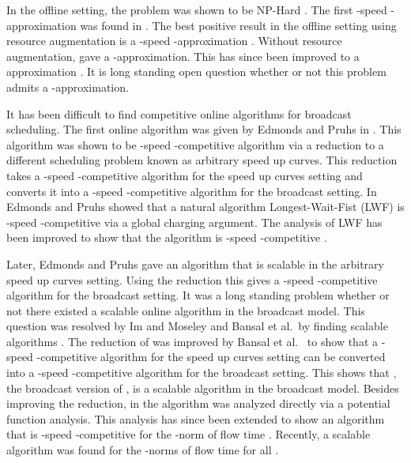 \documentclass[11pt]{article}
\newcommand{\etal}{et al.\ }
\begin{document}
In the offline setting,  the problem was shown to be NP-Hard \cite{ErlebachH02,ChangEGK08}.  The first -speed -approximation was found in \cite{KalyanasundaramPV00}. The best positive result in the offline setting using resource augmentation is a -speed -approximation \cite{BansalCKN05}.    Without resource augmentation, \cite{BansalCKN05} gave a -approximation.  This has since been improved to a  approximation \cite{BansalCS06}.  It is long standing open question whether or not this problem admits a -approximation.

It has been difficult to find competitive online algorithms for broadcast scheduling.  The first online algorithm was given by Edmonds and Pruhs in \cite{EdmondsP03}.  This algorithm was shown to be -speed -competitive algorithm via a reduction to a different scheduling problem known as arbitrary speed up curves.   This reduction takes a -speed -competitive algorithm for the speed up curves setting and converts it into a -speed -competitive algorithm for the broadcast setting.  In \cite{EdmondsP04} Edmonds and Pruhs showed that a natural algorithm Longest-Wait-Fist (LWF) is -speed -competitive via a global charging argument.  The analysis of LWF has been improved to show that the algorithm is -speed -competitive \cite{Chekuri09lwf}. 

Later, Edmonds and Pruhs \cite{EdmondsP09} gave an algorithm  that is scalable in the arbitrary speed up curves setting.  Using the reduction \cite{EdmondsP03} this gives a -speed -competitive algorithm for the broadcast setting. It was a long standing problem whether or not there existed a scalable online algorithm in the broadcast model.  This question was  resolved by Im and Moseley and Bansal \etal by finding scalable algorithms \cite{ImM10,BansalKN09}. The reduction of \cite{EdmondsP03} was improved by Bansal \etal \cite{BansalKN09} to show that a -speed -competitive algorithm for the speed up curves setting can be converted into a -speed -competitive algorithm for the broadcast setting.  This shows that , the broadcast version of , is a scalable algorithm in the broadcast model.  Besides improving the reduction, in \cite{BansalKN09} the algorithm  was analyzed directly via a potential function analysis.  This analysis has since been extended to show an algorithm that is -speed -competitive for the -norm of flow time \cite{GuptaIKMP10}.  Recently, a scalable algorithm was found for the -norms of flow time for all  \cite{EdmondsIM10}.  \\
\end{document}
